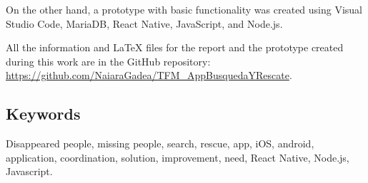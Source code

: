 \documentclass{pclass}
\begin{document}
On the other hand, a prototype with basic functionality was created using Visual Studio Code, MariaDB, React Native, JavaScript, and Node.js.

All the information and LaTeX files for the report and the prototype created during this work are in the GitHub repository: \url{https://github.com/NaiaraGadea/TFM_AppBusquedaYRescate}.

{\centering \subsection*{Keywords} }

Disappeared people, missing people, search, rescue, app, iOS, android, application, coordination, solution, improvement, need, React Native, Node.js, Javascript.

\tableofcontents

\listoffigures

\listoftables

\mainmatter  







\end{document}
